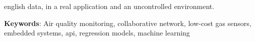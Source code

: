 \begin{resumo}[Abstract]
\begin{otherlanguage*}{english}
data, in a real application and an uncontrolled environment.

		\textbf{Keywords}: Air quality monitoring, collaborative network, low-cost gas sensors, embedded systems, \acrshort{api}, regression models, machine learning
	\end{otherlanguage*}
\end{resumo}

{%
	\hypersetup{hidelinks}
	\listoffigures*
	\cleardoublepage
	
	\listoftables*
	\cleardoublepage
	
	
	\printglossary[title=Lista de Siglas, toctitle=Lista de siglas]

	\tableofcontents*
	\cleardoublepage
	
}%
